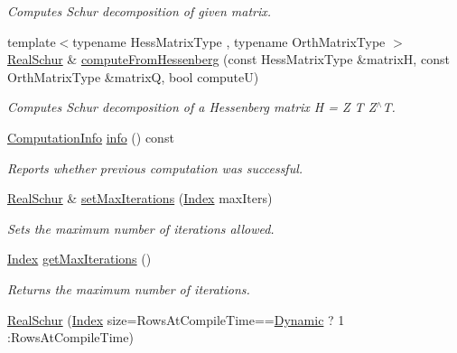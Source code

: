 \begin{DoxyCompactItemize}
\begin{DoxyCompactList}\small\item\em Computes Schur decomposition of given matrix. \end{DoxyCompactList}\item 
{\footnotesize template$<$typename Hess\+Matrix\+Type , typename Orth\+Matrix\+Type $>$ }\\\hyperlink{group___eigenvalues___module_class_eigen_1_1_real_schur}{Real\+Schur} \& \hyperlink{group___eigenvalues___module_ac4acc917dcaddefae5f35acd2c536d65}{compute\+From\+Hessenberg} (const Hess\+Matrix\+Type \&matrixH, const Orth\+Matrix\+Type \&matrixQ, bool computeU)
\begin{DoxyCompactList}\small\item\em Computes Schur decomposition of a Hessenberg matrix H = Z T Z$^\wedge$T. \end{DoxyCompactList}\item 
\hyperlink{group__enums_ga85fad7b87587764e5cf6b513a9e0ee5e}{Computation\+Info} \hyperlink{group___eigenvalues___module_a386fd2b1a3a8401eca7183ac074deec8}{info} () const
\begin{DoxyCompactList}\small\item\em Reports whether previous computation was successful. \end{DoxyCompactList}\item 
\hyperlink{group___eigenvalues___module_class_eigen_1_1_real_schur}{Real\+Schur} \& \hyperlink{group___eigenvalues___module_ad189e8776ee20a12046694f98b354322}{set\+Max\+Iterations} (\hyperlink{group___eigenvalues___module_a8bd4653e2d9569a44ecc95e746422d3f}{Index} max\+Iters)
\begin{DoxyCompactList}\small\item\em Sets the maximum number of iterations allowed. \end{DoxyCompactList}\item 
\mbox{\label{group___eigenvalues___module_a99453076a9617a6af353b5b1f3220c25}} 
\hyperlink{group___eigenvalues___module_a8bd4653e2d9569a44ecc95e746422d3f}{Index} \hyperlink{group___eigenvalues___module_a99453076a9617a6af353b5b1f3220c25}{get\+Max\+Iterations} ()
\begin{DoxyCompactList}\small\item\em Returns the maximum number of iterations. \end{DoxyCompactList}\item 
\hyperlink{group___eigenvalues___module_a826c83e2f1d4c8332606a14ea121ff5f}{Real\+Schur} (\hyperlink{group___eigenvalues___module_a8bd4653e2d9569a44ecc95e746422d3f}{Index} size=Rows\+At\+Compile\+Time==\hyperlink{namespace_eigen_ad81fa7195215a0ce30017dfac309f0b2}{Dynamic} ? 1 \+:Rows\+At\+Compile\+Time)

\end{DoxyCompactItemize}

